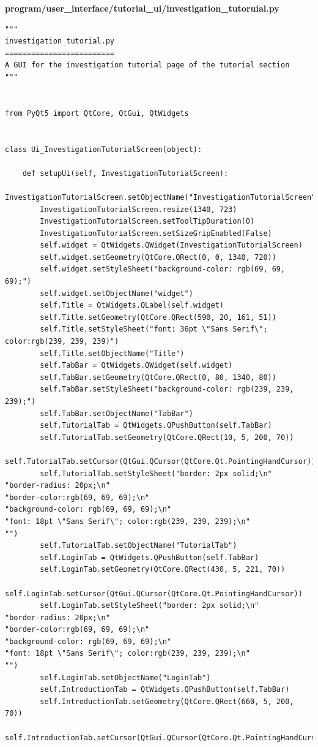 \documentclass[12pt]{article}
\begin{document}
\textbf{program/user\_interface/tutorial\_ui/investigation\_tutoruial.py}
\begin{lstlisting}
"""
investigation_tutorial.py
=========================
A GUI for the investigation tutorial page of the tutorial section
"""


from PyQt5 import QtCore, QtGui, QtWidgets


class Ui_InvestigationTutorialScreen(object):

    def setupUi(self, InvestigationTutorialScreen):
        InvestigationTutorialScreen.setObjectName("InvestigationTutorialScreen")
        InvestigationTutorialScreen.resize(1340, 723)
        InvestigationTutorialScreen.setToolTipDuration(0)
        InvestigationTutorialScreen.setSizeGripEnabled(False)
        self.widget = QtWidgets.QWidget(InvestigationTutorialScreen)
        self.widget.setGeometry(QtCore.QRect(0, 0, 1340, 720))
        self.widget.setStyleSheet("background-color: rgb(69, 69, 69);")
        self.widget.setObjectName("widget")
        self.Title = QtWidgets.QLabel(self.widget)
        self.Title.setGeometry(QtCore.QRect(590, 20, 161, 51))
        self.Title.setStyleSheet("font: 36pt \"Sans Serif\"; color:rgb(239, 239, 239)")
        self.Title.setObjectName("Title")
        self.TabBar = QtWidgets.QWidget(self.widget)
        self.TabBar.setGeometry(QtCore.QRect(0, 80, 1340, 80))
        self.TabBar.setStyleSheet("background-color: rgb(239, 239, 239);")
        self.TabBar.setObjectName("TabBar")
        self.TutorialTab = QtWidgets.QPushButton(self.TabBar)
        self.TutorialTab.setGeometry(QtCore.QRect(10, 5, 200, 70))
        self.TutorialTab.setCursor(QtGui.QCursor(QtCore.Qt.PointingHandCursor))
        self.TutorialTab.setStyleSheet("border: 2px solid;\n"
"border-radius: 20px;\n"
"border-color:rgb(69, 69, 69);\n"
"background-color: rgb(69, 69, 69);\n"
"font: 18pt \"Sans Serif\"; color:rgb(239, 239, 239);\n"
"")
        self.TutorialTab.setObjectName("TutorialTab")
        self.LoginTab = QtWidgets.QPushButton(self.TabBar)
        self.LoginTab.setGeometry(QtCore.QRect(430, 5, 221, 70))
        self.LoginTab.setCursor(QtGui.QCursor(QtCore.Qt.PointingHandCursor))
        self.LoginTab.setStyleSheet("border: 2px solid;\n"
"border-radius: 20px;\n"
"border-color:rgb(69, 69, 69);\n"
"background-color: rgb(69, 69, 69);\n"
"font: 18pt \"Sans Serif\"; color:rgb(239, 239, 239);\n"
"")
        self.LoginTab.setObjectName("LoginTab")
        self.IntroductionTab = QtWidgets.QPushButton(self.TabBar)
        self.IntroductionTab.setGeometry(QtCore.QRect(660, 5, 200, 70))
        self.IntroductionTab.setCursor(QtGui.QCursor(QtCore.Qt.PointingHandCursor))

\end{lstlisting}
\end{document}
